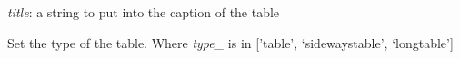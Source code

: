 \documentclass[letterpaper,10pt,english]{sphinxmanual}
\begin{document}
\begin{fulllineitems}

\begin{fulllineitems}
\label{summary:tablemaker.Table.setTitle}
\emph{title}: a string to put into the caption of the table

\end{fulllineitems}


\begin{fulllineitems}
\label{summary:tablemaker.Table.setType}
Set the type of the table. Where \emph{type\_} is in 
{[}'table', `sidewaystable', `longtable'{]}

\end{fulllineitems}


\end{fulllineitems}

\end{document}
